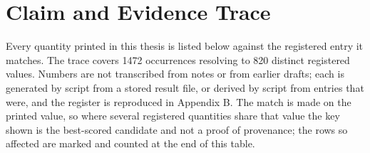 \chapter{Claim and Evidence Trace}
\label{app:trace}

Every quantity printed in this thesis is listed below against the registered entry it
matches. The trace covers 1472 occurrences resolving to 820 distinct
registered values. Numbers are not transcribed from notes or from earlier drafts; each is
generated by script from a stored result file, or derived by script from entries that were,
and the register is reproduced in Appendix B. The match is made on the printed value, so
where several registered quantities share that value the key shown is the best-scored
candidate and not a proof of provenance; the rows so affected are marked and counted at the
end of this table.

